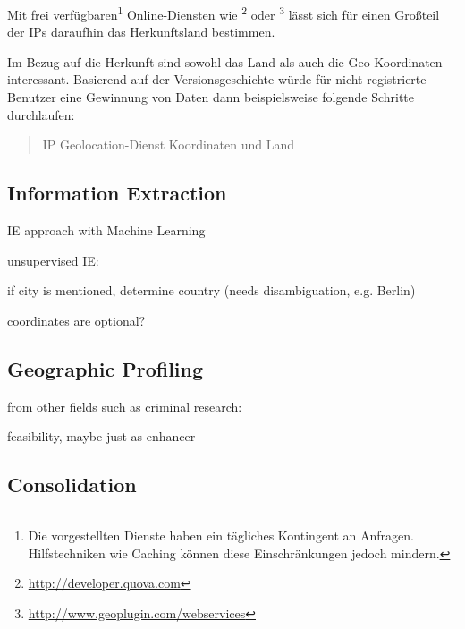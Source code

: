 Mit frei verfügbaren\footnote{Die vorgestellten Dienste haben ein tägliches Kontingent an Anfragen. Hilfstechniken wie Caching können diese Einschränkungen jedoch mindern.} Online-Diensten wie \footnote{\url{http://developer.quova.com}} oder \footnote{\url{http://www.geoplugin.com/webservices}} lässt sich für einen Großteil der IPs daraufhin das Herkunftsland bestimmen.

Im Bezug auf die Herkunft sind sowohl das Land als auch die Geo-Koordinaten interessant.  
Basierend auf der Versionsgeschichte würde für nicht registrierte Benutzer eine Gewinnung von Daten dann beispielsweise folgende Schritte durchlaufen:

\begin{quotation}
IP \RA Geolocation-Dienst \RA Koordinaten und Land
\end{quotation}


\subsection{Information Extraction}

\begin{todos}
    \item IE approach with Machine Learning 
    \item unsupervised IE: 
    \item if city is mentioned, determine country (needs disambiguation, e.g. Berlin)
    \item coordinates are optional?
\end{todos}


\subsection{Geographic Profiling}

\begin{todos}
    \item {}
    \item {}
    \item from other fields such as criminal research: \\ 
    \item feasibility, maybe just as enhancer
\end{todos}


\subsection{Consolidation}


